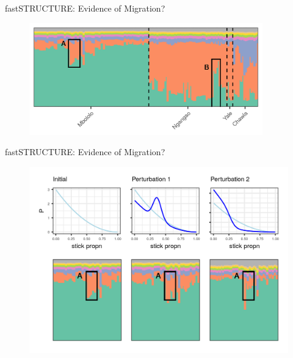 \begin{frame}{fastSTRUCTURE: Evidence of Migration?}

  \begin{figure}[!h]
    \centering
    \includegraphics[width = 0.9\textwidth]{./figure/structure_migration-1.png}
  \end{figure}
\end{frame}

\begin{frame}{fastSTRUCTURE: Evidence of Migration?}
    \begin{figure}[!h]
\centering
\includegraphics[width = \textwidth]{./figure/mbololo_motivating_ex-1.png}
\end{figure}

\end{frame}

